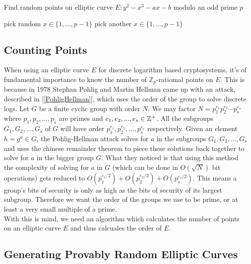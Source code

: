 \begin{algorithm} 
	\caption{Find random points on elliptic curve $E : y^2 - x^3 - ax - b$ modulo an odd prime $p$ }
	\begin{algorithmic}[1]
			\State pick random $x \in \lbrace 1, \dots , p-1 \rbrace $
				\State pick another $x \in  \lbrace 1, \dots , p-1 \rbrace $
			\EndWhile
	  	\EndFunction
	\end{algorithmic} 
\end{algorithm} 


\subsection{Counting Points}

When using an elliptic curve $E$ for discrete logarithm based cryptosystems, it's of fundamental importance to know the number of $\mathbb{Z}_p$-ratiomal points on $E$. This is because in 1978 Stephan Pohlig and Martin Hellman came up with an attack, described in [\ref{PohligHellman}], which uses the order of the group to solve discrete logs. Let $G$ be a finite cyclic group with order $N$. We may factor $N = p_1^{e_1}p_2^{e_2} \cdots p_s^{e_s}$ where $p_1,p_2,...,p_s$ are primes and $e_1,e_2,...,e_s \in \mathbb{Z}^+ $. All the subgroups $G_1,G_2,...,G_s$ of $G$ will have order $p_1^{e_1},p_2^{e_2},...,p_s^{e_s}$ respectively. Given an element $h = g^a \in G$, the Pohlig-Hellman attack solves for $a$  in the subgroups $G_1,G_2,...,G_s$ and uses the chinese remainder theorem to piece these solutions back together to solve for $a$ in the bigger group $G$. What they noticed is that using this method the complexity of solving for $a$ in $G$ (which can be done in $O(\sqrt{N})$ bit operations) gets reduced to $O(p_1^{e_1/2}) + O(p_2^{e_2/2}) + O(p_s^{e_s/2})$. This means a group's bits of security is only as high as the bits of security of its largest subgroup. Therefore we want the order of the groups we use to be prime, or at least a very small multiple of a prime. \\

With this is mind, we need an algorithm which calculates the number of points on an elliptic curve $E$ and thus calcuales the order of $E$. 



\subsection{Generating Provably Random Elliptic Curves}

